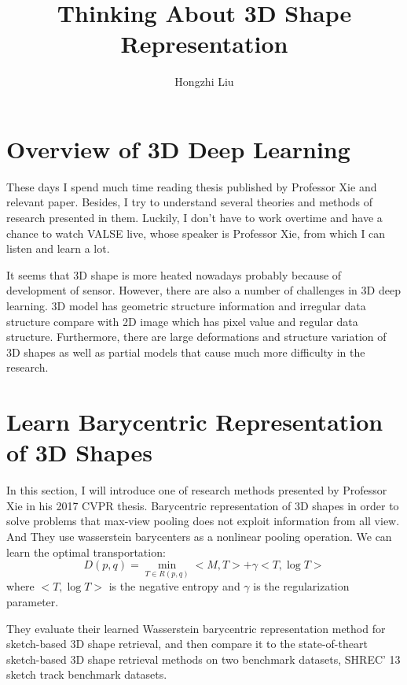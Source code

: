\documentclass{article}
\author{Hongzhi Liu}
\title{Thinking About 3D Shape Representation}
\begin{document}
\maketitle
  \par
  \section{Overview of 3D Deep Learning}
  These days I spend much time reading thesis published by Professor Xie and relevant paper. Besides, I try to understand several theories and methods of research presented in them. Luckily, I don't have to work overtime and have a chance to watch VALSE live, whose speaker is Professor Xie, from which I can listen and learn a lot.

  It seems that 3D shape is more heated nowadays probably because of development of sensor. However, there are also a number of challenges in 3D deep learning. 3D model has geometric structure information and irregular data structure compare with 2D image which has pixel value and regular data structure. Furthermore, there are large deformations and structure variation of 3D shapes as well as partial models that cause much more difficulty in the research.

\section{Learn Barycentric Representation of 3D Shapes}

  In this section, I will introduce one of research methods presented by Professor Xie in his 2017 CVPR thesis. Barycentric representation of 3D shapes in order to solve problems that max-view pooling does not exploit information from all view. And They use wasserstein barycenters as a nonlinear pooling operation. We can learn the optimal transportation\cite{Cuturi2013Sinkhorn}:
\begin{equation}
  D(p,q) = \min_{T \in R(p,q)}<M,T> + \gamma<T,\log T>
 \end{equation}
  where $ < T,\log T > $ is the negative entropy and $ \gamma $ is the regularization parameter.

  They evaluate their learned Wasserstein barycentric representation method for sketch-based 3D shape retrieval, and then compare it to the state-of-theart sketch-based 3D shape retrieval methods on two benchmark datasets, SHREC' 13 sketch track benchmark datasets.
\end{document}
